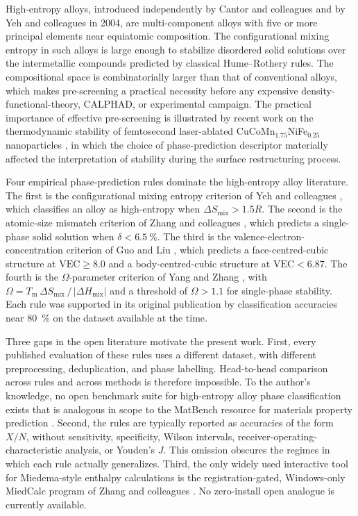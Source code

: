 \documentclass[review,times,nonatbib]{elsarticle}
\newcommand{\Smix}{\ensuremath{\Delta S_{\mathrm{mix}}}}
\newcommand{\Hmix}{\ensuremath{\Delta H_{\mathrm{mix}}}}
\newcommand{\Tm}{\ensuremath{T_{\mathrm{m}}}}
\newcommand{\Omegaparam}{\ensuremath{\Omega}}
\begin{document}
High-entropy alloys, introduced independently by Cantor and
colleagues \cite{cantor2004} and by Yeh and colleagues
\cite{yeh2004} in 2004, are multi-component alloys with five or
more principal elements near equiatomic composition. The
configurational mixing entropy in such alloys is large enough to
stabilize disordered solid solutions over the intermetallic
compounds predicted by classical Hume--Rothery rules. The
compositional space is combinatorially larger than that of
conventional alloys, which makes pre-screening a practical
necessity before any expensive density-functional-theory, CALPHAD,
or experimental campaign. The practical importance of effective
pre-screening is illustrated by recent work on the thermodynamic
stability of femtosecond laser-ablated
CuCoMn$_{1.75}$NiFe$_{0.25}$ nanoparticles
\cite{fieser2025surface}, in which the choice of phase-prediction
descriptor materially affected the interpretation of stability
during the surface restructuring process.

Four empirical phase-prediction rules dominate the high-entropy
alloy literature. The first is the configurational mixing entropy
criterion of Yeh and colleagues \cite{yeh2004}, which classifies
an alloy as high-entropy when $\Smix > 1.5 R$. The second is the
atomic-size mismatch criterion of Zhang and colleagues
\cite{zhang2008}, which predicts a single-phase solid solution
when $\delta < \SI{6.5}{\percent}$. The third is the
valence-electron-concentration criterion of Guo and Liu
\cite{guo2011}, which predicts a face-centred-cubic structure at
$\mathrm{VEC} \geq 8.0$ and a body-centred-cubic structure at
$\mathrm{VEC} < 6.87$. The fourth is the
\Omegaparam{}-parameter criterion of Yang and Zhang
\cite{yang2012}, with $\Omegaparam = \Tm \, \Smix \, / \,
|\Hmix|$ and a threshold of $\Omegaparam > 1.1$ for single-phase
stability. Each rule was supported in its original publication by
classification accuracies near \SI{80}{\percent} on the dataset
available at the time.

Three gaps in the open literature motivate the present work.
First, every published evaluation of these rules uses a different
dataset, with different preprocessing, deduplication, and phase
labelling. Head-to-head comparison across rules and across methods
is therefore impossible. To the author's knowledge, no open
benchmark suite for high-entropy alloy phase classification exists
that is analogous in scope to the MatBench resource for materials
property prediction \cite{dunn2020matbench}. Second, the rules are
typically reported as accuracies of the form $X / N$, without
sensitivity, specificity, Wilson intervals, receiver-operating-
characteristic analysis, or Youden's $J$. This omission obscures
the regimes in which each rule actually generalizes. Third, the
only widely used interactive tool for Miedema-style enthalpy
calculations is the registration-gated, Windows-only MiedCalc
program of Zhang and colleagues \cite{zhang2016miedema}. No
zero-install open analogue is currently available.
\end{document}
